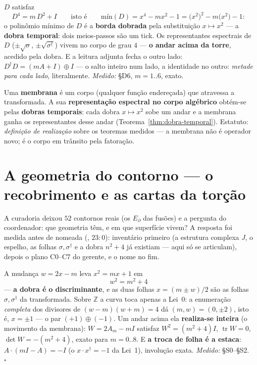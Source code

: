 \documentclass[livro.tex]{subfiles}
\begin{document}
\begin{teorema}\label{thm:dobra-temporal}
$D$ satisfaz
\[
\boxed{D^{4}=m\,D^{2}+I}
\qquad\text{isto é}\qquad
\boxed{\text{mín}(D)=x^{4}-mx^{2}-1=\bigl(x^{2}\bigr)^{2}-m\bigl(x^{2}\bigr)-1:}
\]
o polinômio mínimo de $D$ é a \textbf{borda dobrada} pela substituição
$x\mapsto x^{2}$ --- a \textbf{dobra temporal}: dois meios-passos são um
tick. Os representantes espectrais de $D$ ($\pm\sqrt{\sigma}$,
$\pm\sqrt{\sigma^{\dagger}}$) vivem no corpo de grau $4$ --- \textbf{o
andar acima da torre}, acedido pela dobra. E a leitura adjunta fecha o
outro lado: $D^{\dagger}D=(mA+I)\oplus I$ --- o salto inteiro num lado,
a identidade no outro: \emph{metade para cada lado}, literalmente.
\emph{Medido:} \S D6, $m=1..6$, exato.
\end{teorema}

\begin{definicao}[membrana]\label{def:membrana}
Uma \textbf{membrana} é um corpo (qualquer função endereçada) que
atravessa a transformada. A sua \textbf{representação espectral no
corpo algébrico} obtém-se pelas \textbf{dobras temporais}: cada dobra
$x\mapsto x^{2}$ sobe um andar e a membrana ganha os representantes
desse andar (Teorema~\ref{thm:dobra-temporal}). Estatuto:
\emph{definição de realização} sobre os teoremas medidos --- a membrana
não é operador novo; é o corpo em trânsito pela fatoração.
\end{definicao}

\section{A geometria do contorno --- o recobrimento e as cartas da
torção}\label{sec:contorno-geo}

A curadoria deixou $52$ contornos reais (os $E_{\partial}$ das fusões) e
a pergunta do coordenador: que geometria têm, e em que superfície vivem?
A resposta foi medida antes de nomeada
(, $23{:}0$): inventário primeiro (a
estrutura complexa $J$, o espelho, as folhas $\sigma,\sigma^{\dagger}$ e a dobra
$n^{2}{+}4$ já existiam --- aqui só se articulam), depois o plano
C0--C7 do gerente, e o nome no fim.

\begin{teorema}\label{thm:recobrimento}
A mudança $w=2x-m$ leva $x^{2}=mx+1$ em
\[
\boxed{\;w^{2}=m^{2}+4\;}
\]
--- \textbf{a dobra é o discriminante}, e as duas folhas $x=(m\pm w)/2$
são as folhas $\sigma,\sigma^{\dagger}$ da transformada. Sobre $\mathbb{Z}$
a curva toca apenas a Lei~0: a enumeração \emph{completa} dos divisores
de $(w{-}m)(w{+}m)=4$ dá $(m,w)=(0,\pm2)$, isto é, $x=\pm1$ --- o par
$(+1)\oplus(-1)$. Um andar acima ela \textbf{realiza-se inteira}
(o movimento da membrana): $W=2A_{m}-mI$ satisfaz
$W^{2}=(m^{2}{+}4)I$, $\operatorname{tr}W=0$, $\det W=-(m^{2}{+}4)$,
exato para $m=0..8$. E \textbf{a troca de folha é a estaca}:
$A\cdot(mI-A)=-I$ (o $x\cdot x^{\dagger}=-1$ da Lei~1), involução exata.
\emph{Medido:} \S S0--\S S2. $\square$
\end{teorema}
\end{document}

